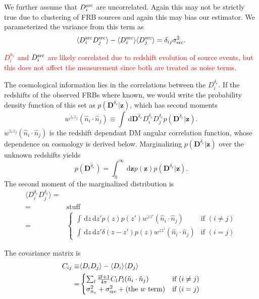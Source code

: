 \documentclass[twocolumn,prd,noshowpacs,nofootinbib,amsmath,amssymb]{revtex4}
\newcommand{\ud}{\,\mathrm{d}}
\newcommand{\red}{\textcolor{red}}
\begin{document}
We further assume that $D^{\rm src}_i$ are uncorrelated. Again this may not
be strictly true due to clustering of FRB sources and again this may bias our
estimator. We parameterized the variance from this term as 
\begin{equation}
    \label{e:sig_src}
    \langle D^{\rm src}_i D^{\rm src}_j \rangle
    - \langle D^{\rm src}_i \rangle \langle D^{\rm src}_j \rangle
    = \delta_{ij} \sigma^2_{\rm src}.
\end{equation}

\red{$D^{\bar{n}_e}_i$ and $D^{\rm src}_i$ are likely correlated due to
    redshift evolution of source events, but this does not affect the
    measurement since both are treated as noise terms.}

The cosmological information lies in the correlations between the
$D^{\delta_e}_i$. If the redshifts of the observed FRBs where known, we
would write the probability density function of this set as
$p(\boldsymbol D^{\delta_e} | \boldsymbol z)$, which has second moments
\begin{equation}
    w^{z_i z_j}(\hat{n}_i\cdot\hat{n}_j) \equiv \int \ud \boldsymbol D^{\delta_e}
        D^{\delta_e}_i D^{\delta_e}_j p(\boldsymbol D^{\delta_e} | \boldsymbol z).
\end{equation}
$w^{z_i z_j}(\hat{n}_i\cdot\hat{n}_j)$ is the redshift dependant DM angular
correlation function, whose dependence on cosmology is derived below.
Marginalizing $p(\boldsymbol D^{\delta_e} | \boldsymbol z)$ over the unknown redshifts
yields
\begin{equation}
    p(\boldsymbol D^{\delta_e}) = \int_0^\infty \ud \boldsymbol z
        p(\boldsymbol z) p(\boldsymbol D^{\delta_e} | \boldsymbol z).
\end{equation}
The second moment of the marginalized distribution is
\begin{align}
    \langle D^{\delta_e}_i D^{\delta_e}_j \rangle =& \\
        =& \textrm{stuff} \\
        =&
        \begin{cases}
            \int \ud z \ud z' p(z) p(z') w^{z z'}(\hat{n}_i\cdot\hat{n}_j) 
                &  \text{if } (i \neq j) \\
            \int \ud z \ud z' \delta(z - z') p(z) w^{z z'}(\hat{n}_i\cdot\hat{n}_j)
                &  \text{if } (i = j)
        \end{cases}
\end{align}

The covariance matrix is
\begin{align}
    C_{ij} \equiv& \langle D_i D_j \rangle - \langle D_i \rangle \langle D_j
    \rangle\\
    =&
        \begin{cases}
            \sum_l \frac{2l+1}{4 \pi} C_l P_l(\hat{n}_i\cdot\hat{n}_j)
                &  \text{if } (i \neq j) \\
            \sigma_{\bar{n}_e}^2 + \sigma^2_{\rm src}
                + \textrm{(the $w$ term)}
                &  \text{if } (i = j)
        \end{cases}
\end{align}
\end{document}
